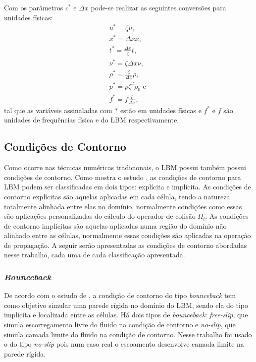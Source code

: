 Com os parâmetros $c^{*}$ e $\Delta x$ pode-se realizar as seguintes conversões para unidades físicas:
\begin{gather*}
	\textbf{$u^{*}$} = \zeta \textbf{$u$}\text{, } \\ \textbf{$x^{*}$} = \Delta x\textbf{$x$}
	\text{, } \\ t^{*} = \frac{\Delta x}{\zeta}t \text{, } \\ \nu^{*} = \zeta \Delta x \nu
	\text{, } \\ \rho^{*} = \frac{\zeta}{\Delta x} \rho \text{, } \\ p^{*} = p \zeta^{2}  \rho_{0} \text{ e } \\ f^{*} = f\frac{\zeta}{\Delta x},
    \label{eq:conversao_1}
\end{gather*}
tal que as variáveis assinaladas com $*$ estão em unidades físicas e $f^{*}$ e $f$ são unidades de frequências física e do LBM respectivamente.

\subsection{Condições de Contorno}

Como ocorre nas técnicas numéricas tradicionais, o LBM possui também possui condições de contorno. Como mostra o estudo , as condições de contorno para LBM podem ser classificadas em dois tipos: explícita e implícita. As condições de contorno explícitas são aquelas aplicadas em cada célula, tendo a natureza totalmente alinhada entre elas no domínio, normalmente condições como essas são aplicações personalizadas do cálculo do operador de colisão $\Omega_{i}$. As condições de contorno implícitas são aquelas aplicadas numa região do domínio não alinhado entre as células, normalmente essas condições são aplicadas na operação de propagação. A seguir serão apresentadas as condições de contorno abordadas nesse trabalho, cada uma de cada classificação apresentada.

\subsubsection{\textit{Bounceback}}

De acordo com o estudo de , a condição de contorno do tipo \textit{bounceback} tem como objetivo simular uma parede rígida no domínio do LBM, sendo ela do tipo implícita e localizada entre as células. Há dois tipos de \textit{bounceback}: \textit{free-slip}, que simula escorregamento livre do fluido na condição de contorno e \textit{no-slip}, que simula camada limite do fluido na condição de contorno. Nesse trabalho foi usado o do tipo \textit{no-slip} pois num caso real o escoamento desenvolve camada limite na parede rígida.

